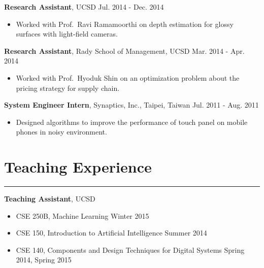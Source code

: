 \documentclass[10pt,letterpaper]{article}
\begin{document}
\noindent 
{\bf Research Assistant}, UCSD \hfill Jul. 2014 - Dec. 2014
\begin{itemize}
\item Worked with Prof.~Ravi Ramamoorthi on depth estimation for glossy surfaces with light-field cameras.
\end{itemize}
\vspace{5pt}

\noindent 
{\bf Research Assistant}, Rady School of Management, UCSD \hfill Mar. 2014 - Apr. 2014
\begin{itemize}
\item Worked with Prof.~Hyoduk Shin on an optimization problem about the pricing strategy for supply chain.%
\end{itemize}
\vspace{5pt}

\noindent 
{\bf System Engineer Intern}, Synaptics, Inc., Taipei, Taiwan \hfill Jul. 2011 - Aug. 2011 
\begin{itemize}
\item Designed algorithms to improve the performance of touch panel on mobile phones in noisy environment.
\end{itemize}
\vspace{-3pt}

\section*{Teaching Experience} \vspace{-8pt}
\hrule \vspace{10pt}
{\bf Teaching Assistant}, UCSD
\begin{itemize}
\item CSE 250B, Machine Learning \hfill Winter 2015
\item CSE 150, Introduction to Artificial Intelligence \hfill Summer 2014
\item CSE 140, Components and Design Techniques for Digital Systems \hfill Spring 2014, Spring 2015
\end{itemize}
\vspace{-3pt}

\end{document}
